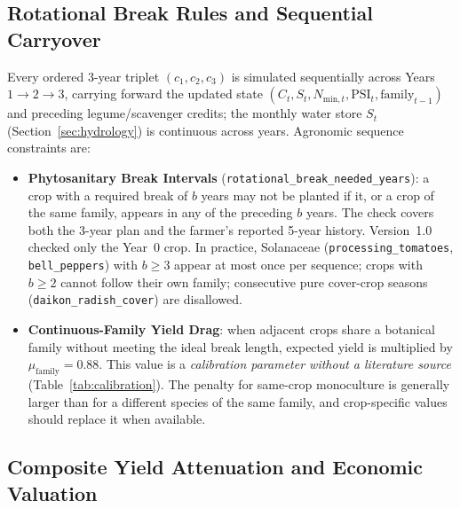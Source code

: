 \subsection{Rotational Break Rules and Sequential Carryover}
Every ordered 3-year triplet $(c_1, c_2, c_3)$ is simulated sequentially across Years $1 \to 2 \to 3$, carrying forward the updated state $(C_t, S_t, N_{\mathrm{min},t}, \mathrm{PSI}_t, \mathrm{family}_{t-1})$ and preceding legume/scavenger credits; the monthly water store $S_t$ (Section~\ref{sec:hydrology}) is continuous across years. Agronomic sequence constraints are:
\begin{itemize}[leftmargin=1.5em]
  \item \textbf{Phytosanitary Break Intervals} (\texttt{rotational\_break\_needed\_years}): a crop with a required break of $b$ years may not be planted if it, or a crop of the same family, appears in any of the preceding $b$ years. The check covers both the 3-year plan and the farmer's reported 5-year history. Version~1.0 checked only the Year~0 crop. In practice, Solanaceae (\texttt{processing\_tomatoes}, \texttt{bell\_peppers}) with $b \ge 3$ appear at most once per sequence; crops with $b \ge 2$ cannot follow their own family; consecutive pure cover-crop seasons (\texttt{daikon\_radish\_cover}) are disallowed.
  \item \textbf{Continuous-Family Yield Drag}: when adjacent crops share a botanical family without meeting the ideal break length, expected yield is multiplied by $\mu_{\mathrm{family}} = 0.88$. This value is a \emph{calibration parameter without a literature source} (Table~\ref{tab:calibration}). The penalty for same-crop monoculture is generally larger than for a different species of the same family, and crop-specific values should replace it when available.
\end{itemize}

\subsection{Composite Yield Attenuation and Economic Valuation}
